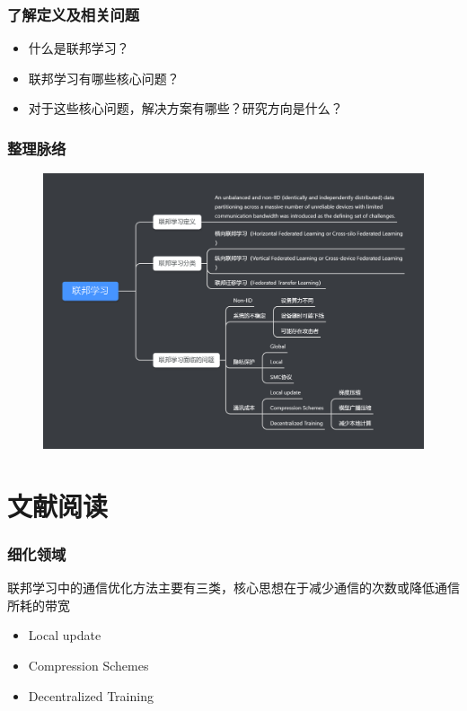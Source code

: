 \documentclass[hyperref={pdfpagelabels=false}]{beamer}
\begin{document}
\begin{frame}
	\frametitle{了解定义及相关问题}
	\begin{itemize}
		\item 什么是联邦学习？
		\item 联邦学习有哪些核心问题？
		\item 对于这些核心问题，解决方案有哪些？研究方向是什么？
	\end{itemize}
\end{frame}

\begin{frame}
	\frametitle{整理脉络}
	\begin{figure}
		\centering
		\includegraphics[width=\textwidth]{./figure/mubu.png}
	\end{figure}
\end{frame}


\section{文献阅读}
\begin{frame}
	\tableofcontents[currentsection]
\end{frame} 

\begin{frame}
	\frametitle{细化领域}
	联邦学习中的通信优化方法主要有三类，核心思想在于减少通信的次数或降低通信所耗的带宽
	\begin{itemize}
		\item Local update
		\item Compression Schemes
		\item Decentralized Training
	\end{itemize}
	
\end{frame}
\end{document}
